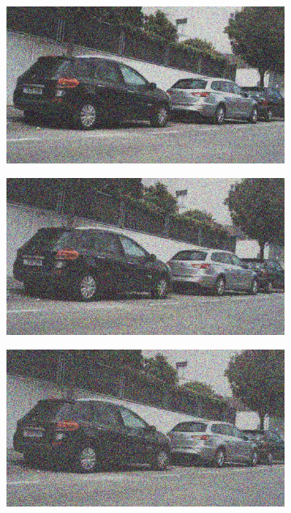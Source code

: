 \documentclass[a4paper]{ctexart}
\begin{document}
\begin{figure}[htbp]
\begin{subfigure}{0.08\textwidth}
			\label{fig：Gamma=0.5, Gauss Noise = 0.4}
		\end{subfigure}
		\begin{subfigure}{0.08\textwidth}
			\captionsetup{font=scriptsize}
			\includegraphics[width=\linewidth]{picture/Edge Detection/degrade/RGB_001 Gamma=0.5, Gauss Noise=0.5}
			\label{fig：Gamma=0.5, Gauss Noise = 0.5}
		\end{subfigure}
		\begin{subfigure}{0.08\textwidth}
			\captionsetup{font=scriptsize}
			\includegraphics[width=\linewidth]{picture/Edge Detection/degrade/RGB_001 Gamma=0.5, Gauss Noise=0.6}
			\label{fig：Gamma=0.5, Gauss Noise = 0.6}
		\end{subfigure}
		\begin{subfigure}{0.08\textwidth}
			\captionsetup{font=scriptsize}
			\includegraphics[width=\linewidth]{picture/Edge Detection/degrade/RGB_001 Gamma=0.5, Gauss Noise=0.7}

\end{subfigure}
\end{figure}
\end{document}
